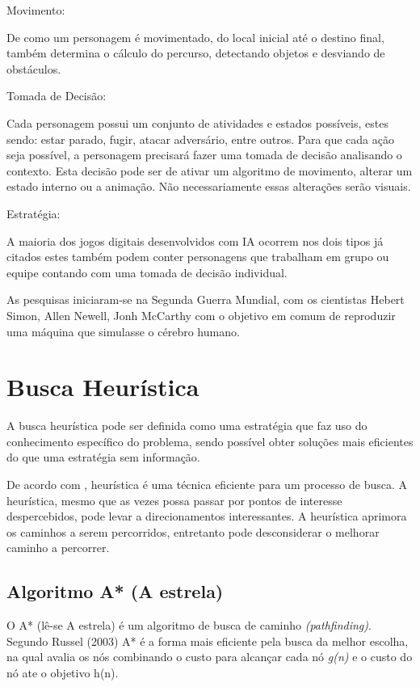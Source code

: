 \begin{alineascomponto}
	
\item Movimento:

De como um personagem é movimentado, do local inicial até o destino final, também determina o cálculo do percurso, detectando objetos e desviando de obstáculos.
   
 \item Tomada de Decisão:
 
Cada personagem possui um conjunto de atividades e estados possíveis, estes sendo: estar parado, fugir, atacar adversário, entre outros. Para que cada ação seja possível, a personagem precisará fazer uma tomada de decisão analisando o contexto. Esta decisão pode ser de ativar um algoritmo de movimento, alterar um estado interno ou a animação. Não necessariamente essas alterações serão visuais.

\item Estratégia:

A maioria dos jogos digitais desenvolvidos com IA ocorrem nos dois tipos já citados estes também podem conter personagens que trabalham em grupo ou equipe contando com uma tomada de decisão individual.

	\end{alineascomponto}

	
As pesquisas iniciaram-se na Segunda Guerra Mundial, com os cientistas Hebert Simon, Allen Newell,  Jonh McCarthy com o objetivo em comum de reproduzir uma máquina que simulasse o cérebro humano. \cite{ia}

\section{Busca Heurística}
\label{sec:Busca-Heurística}

A busca heurística pode ser definida como uma estratégia que faz uso do conhecimento específico do problema, sendo possível obter soluções mais eficientes do que uma estratégia sem informação. \cite{rus}

De acordo com \cite{el}, heurística é uma técnica eficiente para um processo de busca. A heurística, mesmo que as vezes possa passar por pontos de interesse despercebidos, pode levar a direcionamentos interessantes. A heurística aprimora os caminhos a serem percorridos, entretanto pode desconsiderar o melhorar caminho a percorrer. 


\subsection{Algoritmo A* (A estrela)}	
O A* (lê-se A estrela) é um algoritmo de busca de caminho \textit{(pathfinding)}. Segundo Russel (2003) A* é a forma mais eficiente pela busca da melhor escolha, na qual avalia os nós combinando o custo para alcançar cada nó \textit{g(n)} e o custo do nó ate o objetivo h(n).

